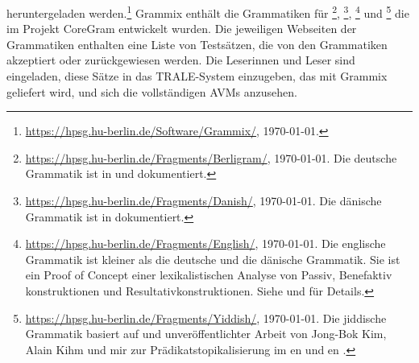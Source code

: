 heruntergeladen werden.\footnote{
\url{https://hpsg.hu-berlin.de/Software/Grammix/}, \today.} Grammix enthält die Grammatiken für
\footnote{
\url{https://hpsg.hu-berlin.de/Fragments/Berligram/}, \today. Die deutsche Grammatik ist in
 und  dokumentiert.
},
\footnote{
\url{https://hpsg.hu-berlin.de/Fragments/Danish/}, \today. Die dänische Grammatik ist in
 dokumentiert.
}, \footnote{
\url{https://hpsg.hu-berlin.de/Fragments/English/}, \today. Die englische Grammatik ist kleiner als die
deutsche und die dänische Grammatik. Sie ist ein Proof of Concept einer lexikalistischen Analyse von Passiv, Benefaktiv\-
konstruktionen und Resultativkonstruktionen. Siehe  und  für Details.
} und \footnote{
\url{https://hpsg.hu-berlin.de/Fragments/Yiddish/}, \today. Die jiddische Grammatik basiert auf
 und unveröffentlichter Arbeit von Jong-Bok Kim, Alain Kihm und mir zur
Prädikatstopikalisierung im en und en \citep*{MKK2019a}.
} die im Projekt CoreGram \citep{MuellerCoreGram} entwickelt wurden. Die jeweiligen Webseiten der Grammatiken enthalten eine Liste von Testsätzen,
die von den Grammatiken akzeptiert oder zurückgewiesen werden. Die Leserinnen und Leser sind eingeladen, diese
Sätze in das TRALE-System \citep{DKMM2004a-u,Penn2004a-u} einzugeben, das mit Grammix geliefert
wird, und sich die vollständigen AVMs anzusehen.

